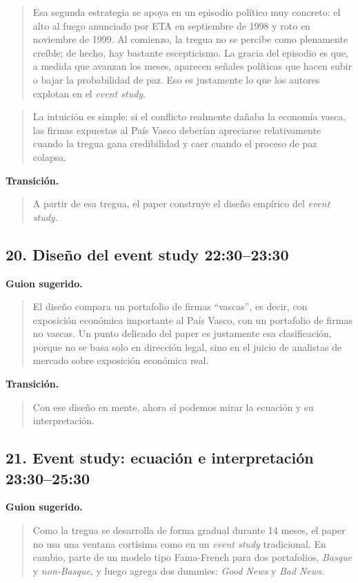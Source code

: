 \documentclass[11pt]{article}
\newcommand{\slideentry}[2]{\subsection*{#1 \hfill #2}}
\begin{document}
\begin{quote}
Esa segunda estrategia se apoya en un episodio político muy concreto: el alto al fuego anunciado por ETA en septiembre de 1998 y roto en noviembre de 1999. Al comienzo, la tregua no se percibe como plenamente creíble; de hecho, hay bastante escepticismo. La gracia del episodio es que, a medida que avanzan los meses, aparecen señales políticas que hacen subir o bajar la probabilidad de paz. Eso es justamente lo que los autores explotan en el \emph{event study}.
\end{quote}

\begin{quote}
La intuición es simple: si el conflicto realmente dañaba la economía vasca, las firmas expuestas al País Vasco deberían apreciarse relativamente cuando la tregua gana credibilidad y caer cuando el proceso de paz colapsa.
\end{quote}

\textbf{Transición.}
\begin{quote}
A partir de esa tregua, el paper construye el diseño empírico del \emph{event study}.
\end{quote}

\slideentry{20. Diseño del event study}{22:30--23:30}

\textbf{Guion sugerido.}
\begin{quote}
El diseño compara un portafolio de firmas ``vascas'', es decir, con exposición económica importante al País Vasco, con un portafolio de firmas no vascas. Un punto delicado del paper es justamente esa clasificación, porque no se basa solo en dirección legal, sino en el juicio de analistas de mercado sobre exposición económica real.
\end{quote}

\textbf{Transición.}
\begin{quote}
Con ese diseño en mente, ahora sí podemos mirar la ecuación y su interpretación.
\end{quote}

\slideentry{21. Event study: ecuación e interpretación}{23:30--25:30}

\textbf{Guion sugerido.}
\begin{quote}
Como la tregua se desarrolla de forma gradual durante 14 meses, el paper no usa una ventana cortísima como en un \emph{event study} tradicional. En cambio, parte de un modelo tipo Fama-French para dos portafolios, \emph{Basque} y \emph{non-Basque}, y luego agrega dos dummies: \emph{Good News} y \emph{Bad News}.
\end{quote}
\end{document}

